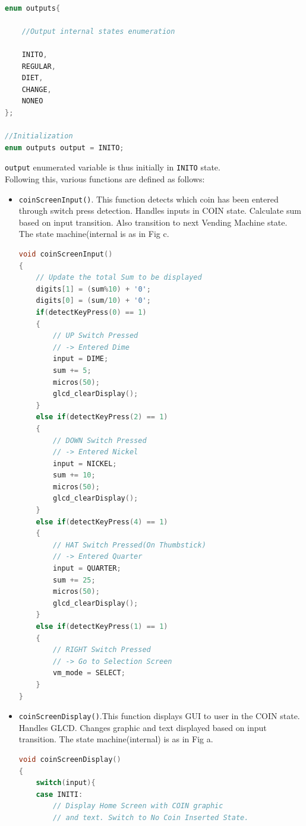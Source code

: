 \documentclass{article}
\begin{document}
    \begin{lstlisting}[basicstyle = \small, language = C]

enum outputs{

    //Output internal states enumeration

    INITO,
    REGULAR,
    DIET,
    CHANGE,
    NONEO
};

//Initialization
enum outputs output = INITO;
  \end{lstlisting}
    \texttt{output} enumerated variable is thus initially in \texttt{INITO} state. \\
\qquad Following this, various functions are defined as follows:
\begin{itemize}
  \item \texttt{coinScreenInput()}. This function detects which coin has been entered through switch press detection. Handles inputs in COIN state. Calculate sum based on input transition. Also transition to next Vending Machine state. The state machine(internal is as in Fig c.
      \begin{lstlisting}[basicstyle = \small, language = C]
void coinScreenInput()
{
    // Update the total Sum to be displayed
    digits[1] = (sum%10) + '0';
    digits[0] = (sum/10) + '0';
    if(detectKeyPress(0) == 1)
    {
        // UP Switch Pressed 
        // -> Entered Dime
        input = DIME;
        sum += 5;
        micros(50);
        glcd_clearDisplay();
    }
    else if(detectKeyPress(2) == 1)
    {
        // DOWN Switch Pressed 
        // -> Entered Nickel
        input = NICKEL;
        sum += 10;
        micros(50);
        glcd_clearDisplay();
    }
    else if(detectKeyPress(4) == 1)
    {
        // HAT Switch Pressed(On Thumbstick) 
        // -> Entered Quarter
        input = QUARTER;
        sum += 25;
        micros(50);
        glcd_clearDisplay();
    }
    else if(detectKeyPress(1) == 1)
    {
        // RIGHT Switch Pressed 
        // -> Go to Selection Screen
        vm_mode = SELECT;
    }
}
  \end{lstlisting}
  \item \texttt{coinScreenDisplay()}.This function displays GUI to user in the COIN state. Handles GLCD. Changes graphic and text displayed based on input transition. The state machine(internal) is as in Fig a.
      \begin{lstlisting}[basicstyle = \small, language = C]
void coinScreenDisplay()
{
    switch(input){
    case INITI:
        // Display Home Screen with COIN graphic 
        // and text. Switch to No Coin Inserted State.

\end{lstlisting}
\end{itemize}
\end{document}
